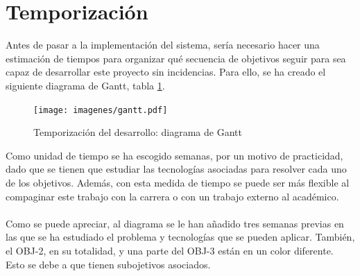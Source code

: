 \section{Temporización}
Antes de pasar a la implementación del sistema, sería necesario hacer una estimación de tiempos para organizar qué secuencia de objetivos seguir para sea capaz de desarrollar este proyecto sin incidencias. Para ello, se ha creado el siguiente diagrama de Gantt, tabla \ref{gantt}.
\begin{figure}[H]
	\centering
	\texttt{[image: imagenes/gantt.pdf]}
	\caption{Temporización del desarrollo: diagrama de Gantt}
	\label{gantt}
\end{figure}
Como unidad de tiempo se ha escogido semanas, por un motivo de practicidad, dado que se tienen que estudiar las tecnologías asociadas para resolver cada uno de los objetivos. Además, con esta medida de tiempo se puede ser más flexible al compaginar este trabajo con la carrera o con un trabajo externo al académico.
\\\\
Como se puede apreciar, al diagrama se le han añadido tres semanas previas en las que se ha estudiado el problema y tecnologías que se pueden aplicar. También, el OBJ-2, en su totalidad, y una parte del OBJ-3 están en un color diferente. Esto se debe a que tienen subojetivos asociados.
